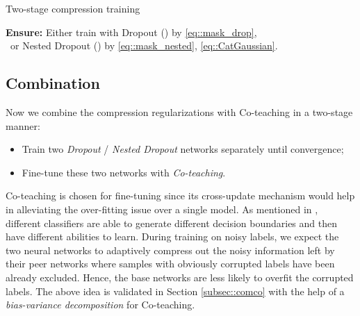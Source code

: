 \documentclass[journal]{IEEEtran}
\begin{document}
\begin{algorithm}[t]
\caption{Two-stage compression training}
	\label{alg::twostage}
	{\bf Ensure:} Either train with Dropout () by \eqref{eq::mask_drop}, \\
	\quad \quad \quad \, or Nested Dropout () by \eqref{eq::mask_nested}, \eqref{eq::CatGaussian}.

	
	\KwOut{}
\end{algorithm} 


\subsection{Combination} \label{subsec::combination}
Now we combine the compression regularizations with Co-teaching in a two-stage manner:
\begin{itemize}
    \item Train two \textit{Dropout} / \textit{Nested Dropout} networks separately until convergence;
    \item Fine-tune these two networks with \textit{Co-teaching}.
\end{itemize}

Co-teaching is chosen for fine-tuning since its cross-update mechanism would help in alleviating the over-fitting issue over a single model.
As mentioned in \cite{han2018co}, different classifiers are able to generate different decision boundaries and then have different abilities to learn.
During training on noisy labels, we expect the two neural networks to adaptively compress out the noisy information left by their peer networks where samples with obviously corrupted labels have been already excluded.
Hence, the base networks are less likely to overfit the corrupted labels. 
The above idea is validated in Section \ref{subsec::comco} with the help of a \textit{bias-variance decomposition} for Co-teaching.
\end{document}
